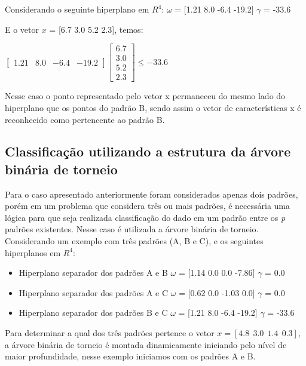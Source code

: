 Considerando o seguinte hiperplano em $R^{4}$:
$\omega$ = [1.21  8.0  -6.4  -19.2]
$\gamma$ = -33.6

E o vetor $x$ = [6.7  3.0  5.2  2.3], temos:

$ \begin{bmatrix}
1.21 & 8.0 & -6.4 & -19.2 
\end{bmatrix}
\begin{bmatrix}
6.7
\\ 
3.0
\\
5.2 
\\
2.3 
\end{bmatrix}
\leq  -33.6 $ 

Nesse caso o ponto representado pelo vetor x permaneceu do mesmo lado do hiperplano que os pontos do padrão B, sendo assim o vetor de características x é reconhecido como pertencente ao padrão B. 

\subsection{Classificação utilizando a estrutura da árvore binária de torneio}
Para o caso apresentado anteriormente foram considerados apenas dois padrões, porém em um problema que considera três ou mais padrões, é necessária uma lógica para que seja realizada classificação do dado em um padrão entre os \textit{p} padrões existentes. Nesse caso é utilizada a árvore binária de torneio.
Considerando um exemplo com três padrões (A, B e C), e os seguintes hiperplanos em $R^{4}$:
\begin{itemize}
\item Hiperplano separador dos padrões A e B
\subitem $\omega$ = [1.14  0.0  0.0  -7.86]
\subitem $\gamma$ = 0.0
\item Hiperplano separador dos padrões A e C
\subitem $\omega$ = [0.62  0.0  -1.03  0.0]
\subitem $\gamma$ = 0.0
\item Hiperplano separador dos padrões B e C
\subitem $\omega$ = [1.21  8.0  -6.4  -19.2]
\subitem $\gamma$ = -33.6
\end{itemize}

Para determinar a qual dos três padrões pertence o vetor $x = [4.8\ \ 3.0\ \ 1.4\ \ 0.3]$, a árvore binária de torneio é montada dinamicamente iniciando pelo nível de maior profundidade, nesse exemplo iniciamos com os padrões A e B.

